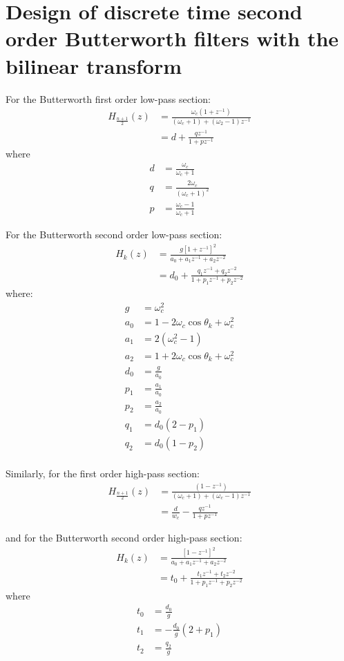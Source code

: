 \documentclass[a4paper,twoside,10pt,english]{report}
\begin{document}
\section{Design of discrete time second order Butterworth filters with the bilinear transform}
For the Butterworth first order low-pass section:
\begin{align*}
H_{\frac{n+1}{2}}\left(z\right)&=\frac{\omega_{c}\left(1+z^{-1}\right)}
{\left(\omega_{c}+1\right)+\left(\omega_{2}-1\right)z^{-1}}\\
&= d+\frac{qz^{-1}}{1+pz^{-1}}
\end{align*}
where
\begin{align*}
  d &= \frac{\omega_{c}}{\omega_{c}+1} \\
  q &= \frac{2\omega_c}{\left(\omega_{c}+1\right)^{2}} \\
  p &= \frac{\omega_{c}-1}{\omega_{c}+1}
\end{align*}

For the Butterworth second order low-pass section:
\begin{align*}
H_{k}\left(z\right)&=\frac{g\left[1+z^{-1}\right]^{2}}
{a_{0}+a_{1}z^{-1}+a_{2}z^{-2}}\\
&= d_{0}+\frac{q_{1}z^{-1}+q_{2}z^{-2}}{1+p_{1}z^{-1}+p_{2}z^{-2}}
\end{align*}
where:
\begin{align*}
g&=\omega_{c}^{2}\\
a_{0}&=1-2\omega_{c}\cos\theta_{k}+\omega_{c}^{2}\\
a_{1}&=2\left(\omega_{c}^{2}-1\right)\\
a_{2}&=1+2\omega_{c}\cos\theta_{k}+\omega_{c}^{2} \\
d_{0}&=\frac{g}{a_{0}}\\
p_{1}&=\frac{a_{1}}{a_{0}} \\
p_{2}&=\frac{a_{2}}{a_{0}} \\
q_{1}&=d_{0}\left(2-p_{1}\right) \\
q_{2}&=d_{0}\left(1-p_{2}\right) \\
\end{align*}

Similarly, for the first order high-pass section:
\begin{align*}
H_{\frac{n+1}{2}}\left(z\right)&=\frac{\left(1-z^{-1}\right)}
{\left(\omega_{c}+1\right)+\left(\omega_{c}-1\right)z^{-1}} \\
&= \frac{d}{w_{c}}-\frac{qz^{-1}}{1+pz^{-1}}
\end{align*}

and for the Butterworth second order high-pass section:
\begin{align*}
H_{k}\left(z\right)&=\frac{\left[1-z^{-1}\right]^{2}}
{a_{0}+a_{1}z^{-1}+a_{2}z^{-2}} \\
&=t_{0}+\frac{t_{1}z^{-1}+t_{2}z^{-2}}{1+p_{1}z^{-1}+p_{2}z^{-2}}
\end{align*}
where
\begin{align*}
  t_{0}&=\frac{d_{0}}{g}\\
  t_{1}&=-\frac{d_{0}}{g}\left(2+p_{1}\right)\\
  t_{2}&=\frac{q_{2}}{g}
\end{align*}
\cleardoublepage
\end{document}
